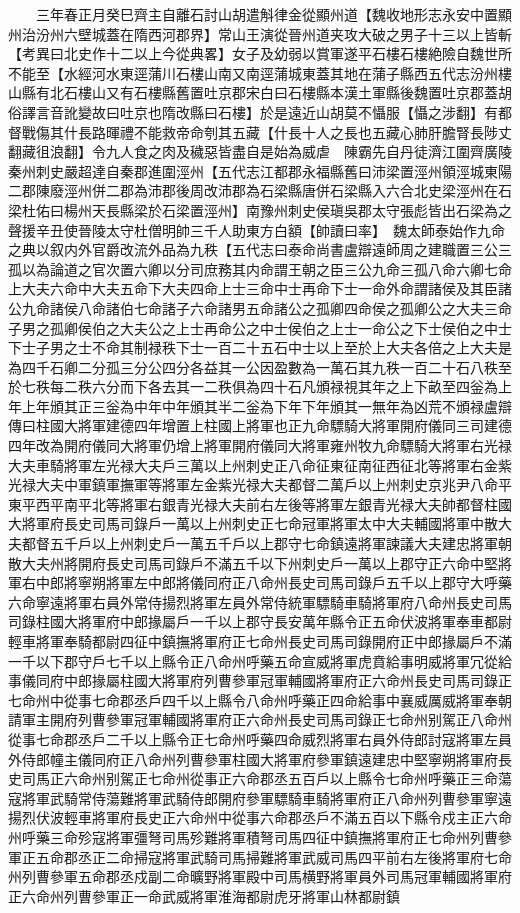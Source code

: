 　　三年春正月癸巳齊主自離石討山胡遣斛律金從顯州道【魏收地形志永安中置顯州治汾州六壁城蓋在隋西河郡界】常山王演從晉州道夹攻大破之男子十三以上皆斬　【考異曰北史作十二以上今從典畧】女子及幼弱以賞軍遂平石樓石樓絶險自魏世所不能至【水經河水東逕蒲川石樓山南又南逕蒲城東蓋其地在蒲子縣西五代志汾州樓山縣有北石樓山又有石樓縣舊置吐京郡宋白曰石樓縣本漢土軍縣後魏置吐京郡蓋胡俗譯言音訛變故曰吐京也隋改縣曰石樓】於是遠近山胡莫不懾服【懾之涉翻】有都督戰傷其什長路暉禮不能救帝命刳其五藏【什長十人之長也五藏心肺肝膽腎長陟丈翻藏徂浪翻】令九人食之肉及穢惡皆盡自是始為威虐　陳霸先自丹徒濟江圍齊廣陵秦州刺史嚴超達自秦郡進圍涇州【五代志江都郡永福縣舊曰沛梁置涇州領涇城東陽二郡陳廢涇州併二郡為沛郡後周改沛郡為石梁縣唐併石梁縣入六合北史梁涇州在石梁杜佑曰楊州天長縣梁於石梁置涇州】南豫州刺史侯瑱吳郡太守張彪皆出石梁為之聲援辛丑使晉陵太守杜僧明帥三千人助東方白額【帥讀曰率】　魏太師泰始作九命之典以叙内外官爵改流外品為九秩【五代志曰泰命尚書盧辯遠師周之建職置三公三孤以為論道之官次置六卿以分司庶務其内命謂王朝之臣三公九命三孤八命六卿七命上大夫六命中大夫五命下大夫四命上士三命中士再命下士一命外命謂諸侯及其臣諸公九命諸侯八命諸伯七命諸子六命諸男五命諸公之孤卿四命侯之孤卿公之大夫三命子男之孤卿侯伯之大夫公之上士再命公之中士侯伯之上士一命公之下士侯伯之中士下士子男之士不命其制禄秩下士一百二十五石中士以上至於上大夫各倍之上大夫是為四千石卿二分孤三分公四分各益其一公因盈數為一萬石其九秩一百二十石八秩至於七秩每二秩六分而下各去其一二秩俱為四十石凡頒禄視其年之上下畝至四釡為上年上年頒其正三釡為中年中年頒其半二釡為下年下年頒其一無年為凶荒不頒禄盧辯傳曰柱國大將軍建德四年增置上柱國上將軍也正九命驃騎大將軍開府儀同三司建德四年改為開府儀同大將軍仍增上將軍開府儀同大將軍雍州牧九命驃騎大將軍右光禄大夫車騎將軍左光禄大夫戶三萬以上州刺史正八命征東征南征西征北等將軍右金紫光禄大夫中軍鎮軍撫軍等將軍左金紫光禄大夫都督二萬戶以上州刺史京兆尹八命平東平西平南平北等將軍右銀青光禄大夫前右左後等將軍左銀青光禄大夫帥都督柱國大將軍府長史司馬司錄戶一萬以上州刺史正七命冠軍將軍太中大夫輔國將軍中散大夫都督五千戶以上州刺史戶一萬五千戶以上郡守七命鎮遠將軍諫議大夫建忠將軍朝散大夫州將開府長史司馬司錄戶不滿五千以下州刺史戶一萬以上郡守正六命中堅將軍右中郎將寧朔將軍左中郎將儀同府正八命州長史司馬司錄戶五千以上郡守大呼藥六命寧遠將軍右員外常侍揚烈將軍左員外常侍統軍驃騎車騎將軍府八命州長史司馬司錄柱國大將軍府中郎掾屬戶一千以上郡守長安萬年縣令正五命伏波將軍奉車都尉輕車將軍奉騎都尉四征中鎮撫將軍府正七命州長史司馬司錄開府正中郎掾屬戶不滿一千以下郡守戶七千以上縣令正八命州呼藥五命宣威將軍虎賁給事明威將軍冗從給事儀同府中郎掾屬柱國大將軍府列曹參軍冠軍輔國將軍府正六命州長史司馬司錄正七命州中從事七命郡丞戶四千以上縣令八命州呼藥正四命給事中襄威厲威將軍奉朝請軍主開府列曹參軍冠軍輔國將軍府正六命州長史司馬司錄正七命州别駕正八命州從事七命郡丞戶二千以上縣令正七命州呼藥四命威烈將軍右員外侍郎討寇將軍左員外侍郎幢主儀同府正八命州列曹參軍柱國大將軍府參軍鎮遠建忠中堅寧朔將軍府長史司馬正六命州别駕正七命州從事正六命郡丞五百戶以上縣令七命州呼藥正三命蕩寇將軍武騎常侍蕩難將軍武騎侍郎開府參軍驃騎車騎將軍府正八命州列曹參軍寧遠揚烈伏波輕車將軍府長史正六命州中從事六命郡丞戶不滿五百以下縣令戍主正六命州呼藥三命殄寇將軍彊弩司馬殄難將軍積弩司馬四征中鎮撫將軍府正七命州列曹參軍正五命郡丞正二命掃寇將軍武騎司馬掃難將軍武威司馬四平前右左後將軍府七命州列曹參軍五命郡丞戍副二命曠野將軍殿中司馬横野將軍員外司馬冠軍輔國將軍府正六命州列曹參軍正一命武威將軍淮海都尉虎牙將軍山林都尉鎮
